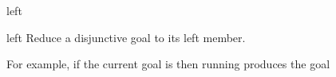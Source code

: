 \begin{tactic}{left}
  \begin{tsyntax}[empty]{left}
  Reduce a disjunctive goal to its left member.

  For example, if the current goal is
   then
  running 
  produces the goal
  \end{tsyntax}
\end{tactic}
